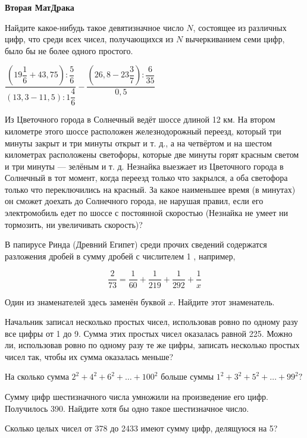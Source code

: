 \centerline{\bf \Huge Вторая МатДрака}

 Найдите какое-нибудь такое девятизначное число $N$, состоящее из различных цифр, что среди всех чисел, получающихся из $N$ вычеркиванием семи цифр,
было бы не более одного простого.

 $\dfrac{\left(19 \dfrac{1}{6}+43,75\right): \dfrac{5}{6}}{(13,3-11,5): 1 \dfrac{4}{6}}-\dfrac{\left(26,8-23 \dfrac{3}{7}\right): \dfrac{6}{35}}{0,5}$

 Из Цветочного города в Солнечный ведёт шоссе
длиной 12 км. На втором километре этого шоссе расположен железнодорожный переезд, который три минуты закрыт и три минуты открыт и т. д., а на четвёртом и на шестом километрах
расположены светофоры, которые две минуты горят красным светом и три минуты — зелёным и т. д. Незнайка выезжает из Цветочного города в Солнечный в тот момент, когда переезд
только что закрылся, а оба светофора только что переключились на красный. За какое наименьшее время (в минутах) он сможет доехать до Солнечного города, не нарушая правил, если
его электромобиль едет по шоссе с постоянной скоростью (Незнайка не умеет ни тормозить, ни
увеличивать скорость)?


 В папирусе Ринда (Древний Египет) среди прочих сведений содержатся разложения дробей в сумму дробей с числителем 1 , например,

$$
\dfrac{2}{73}=\dfrac{1}{60}+\dfrac{1}{219}+\dfrac{1}{292}+\dfrac{1}{x}
$$


Один из знаменателей здесь заменён буквой $x$. Найдите этот знаменатель.

 Начальник записал несколько простых чисел, использовав ровно по одному
разу все цифры от 1 до 9. Сумма этих простых чисел оказалась равной 225. Можно ли, использовав ровно по одному разу те же цифры, записать несколько простых чисел так, чтобы
их сумма оказалась меньше?

 На сколько сумма $2^2+4^2+6^2+\ldots+100^2$ больше суммы $1^2+3^2+5^2+\ldots+99^2 ?$

 Сумму цифр шестизначного числа умножили на произведение его цифр. Получилось 390. Найдите хотя бы одно такое шестизначное число.

 Сколько целых чисел от 378 до 2433 имеют сумму цифр, делящуюся
на 5?

\newpage

\hspace{3mm}

